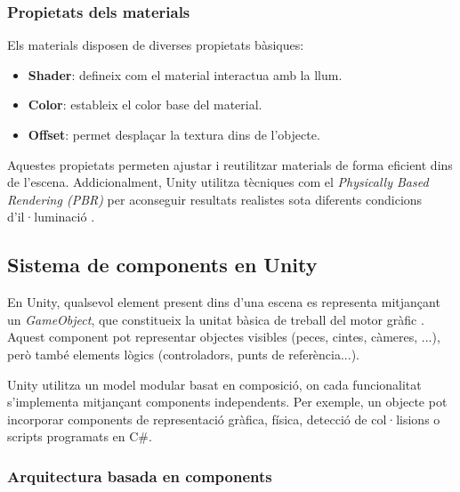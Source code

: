 \documentclass[a4paper,11pt,DIV=13,headings=normal,abstract=true,twoside=semi]{article}
\begin{document}
\subsubsection{Propietats dels materials }

Els materials disposen de diverses propietats bàsiques:

\begin{itemize}

\item \textbf{Shader}: defineix com el material interactua amb la llum. \cite{UnityShaders}
\item \textbf{Color}: estableix el color base del material.
\item \textbf{Offset}: permet desplaçar la textura dins de l'objecte. \cite{UnityTextureProperties}

\end{itemize}

Aquestes propietats permeten ajustar i reutilitzar materials de forma eficient dins de l'escena. Addicionalment, Unity utilitza tècniques com el \textit{Physically Based Rendering (PBR)} per aconseguir resultats realistes sota diferents condicions d'il·luminació \cite{UnityMaterialsIntro}. 

\subsection{Sistema de components en Unity}


En Unity, qualsevol element present dins d'una escena es representa mitjançant un \textit{GameObject}, que constitueix la unitat bàsica de treball del motor gràfic \cite{UnityGameObjects}. Aquest component pot representar objectes visibles (peces, cintes, càmeres, ...), però també elements lògics (controladors, punts de referència...). 

Unity utilitza un model modular basat en composició, on cada funcionalitat s'implementa mitjançant components independents. Per exemple, un objecte pot incorporar components de representació gràfica, física, detecció de col·lisions o scripts programats en C\#.


\subsubsection{Arquitectura basada en components}
\end{document}
